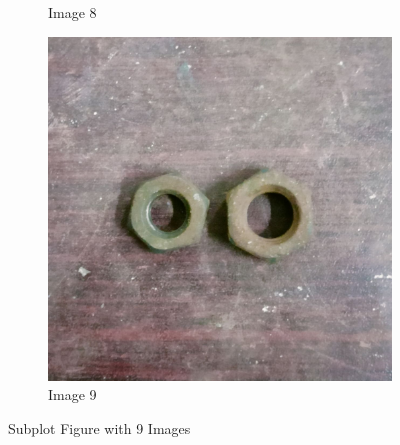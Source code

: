 \documentclass[12pt]{article}
\begin{document}
\begin{figure}[h]
\begin{subfigure}{0.3\textwidth}
        \caption{Image 8}
    \end{subfigure}
    \hfill
    \begin{subfigure}{0.3\textwidth}
        \includegraphics[width=\linewidth]{img/p_09.jpg}
        \caption{Image 9}
    \end{subfigure}
  
    \caption{Subplot Figure with 9 Images}
  \end{figure}
\end{document}
